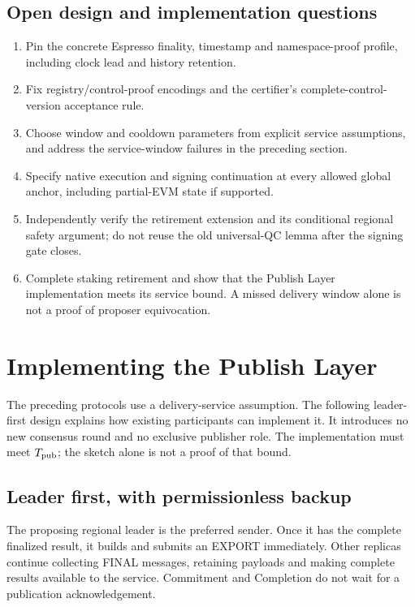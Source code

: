 \documentclass[11pt,a4paper]{article}
\newcounter{protocol}
\begin{document}
\subsection{Open design and implementation questions}
\begin{enumerate}[label=(\arabic*)]
\item Pin the concrete Espresso finality, timestamp and namespace-proof
profile, including clock lead and history retention.
\item Fix registry/control-proof encodings and the certifier's
complete-control-version acceptance rule.
\item Choose window and cooldown parameters from explicit service
assumptions, and address the service-window failures in the preceding section.
\item Specify native execution and signing continuation at every
allowed global anchor, including partial-EVM state if supported.
\item Independently verify the retirement extension and its conditional
regional safety argument; do not reuse the old universal-QC lemma after
the signing gate closes.
\item Complete staking retirement and show that the Publish Layer
implementation meets its service bound. A missed delivery window alone
is not a proof of proposer equivocation.
\end{enumerate}

\section{Implementing the Publish Layer}
\label{sec:publish-implementation}
The preceding protocols use a delivery-service assumption. The following
leader-first design explains how existing participants can implement it.
It introduces no new consensus round and no exclusive publisher role.
The implementation must meet $T_{\rm pub}$; the sketch alone is not a
proof of that bound.

\subsection{Leader first, with permissionless backup}
The proposing regional leader is the preferred sender. Once it has the
complete finalized result, it builds and submits an EXPORT immediately.
Other replicas continue collecting FINAL messages, retaining payloads and
making complete results available to the service. Commitment and
Completion do not wait for a publication acknowledgement.
\end{document}
